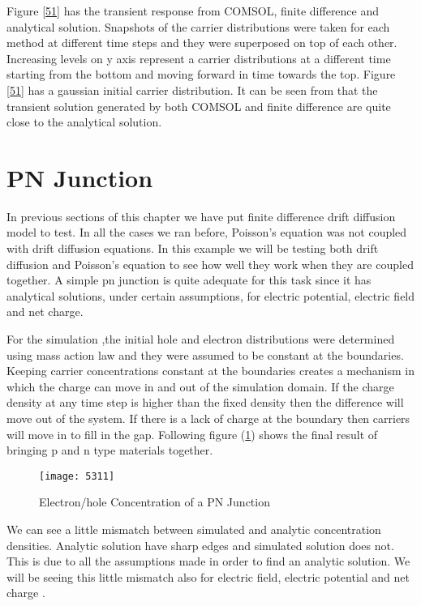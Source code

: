 Figure \ref{51} has the transient response from COMSOL, finite difference and analytical solution. Snapshots of the carrier distributions were taken for each method at different time steps and they were superposed on top of each other. Increasing levels on y axis represent a carrier distributions at a different time starting from the bottom and moving forward in time towards the top. Figure \ref{51} has a gaussian initial carrier distribution. It can be seen from that the transient solution generated by both COMSOL and finite difference are quite close to the analytical solution.


\clearpage
\section{PN Junction}
In previous sections of this chapter we have put finite difference drift diffusion model to test. In all the cases we ran before, Poisson's equation was not coupled with drift diffusion equations. In this example we will be testing both drift diffusion and Poisson's equation to see how well they work when they are coupled together. A simple pn junction is quite adequate for this task since it has analytical solutions, under certain assumptions, for electric potential, electric field and net charge.

For the simulation ,the initial hole and electron distributions were determined using mass action law and they were assumed to be constant at the boundaries. Keeping carrier concentrations constant at the boundaries creates a mechanism in which the charge can move in and out of the simulation domain. If the charge density at any time step is higher than the fixed density then the difference will move out of the system. If there is a lack of charge at the boundary then carriers will move in to fill in the gap. Following figure (\ref{npcon}) shows the final result of bringing p and n type materials together. 
 
\begin{figure}[ht]
\centering
\texttt{[image: 5311]}
\caption{Electron/hole Concentration of a PN Junction} 
\label{npcon}
\end{figure}

We can see a little mismatch between simulated and analytic concentration densities. Analytic solution have sharp edges and simulated solution does not. This is due to all the assumptions made in order to find an analytic solution. We will be seeing this little mismatch also for electric field, electric potential and net charge .

